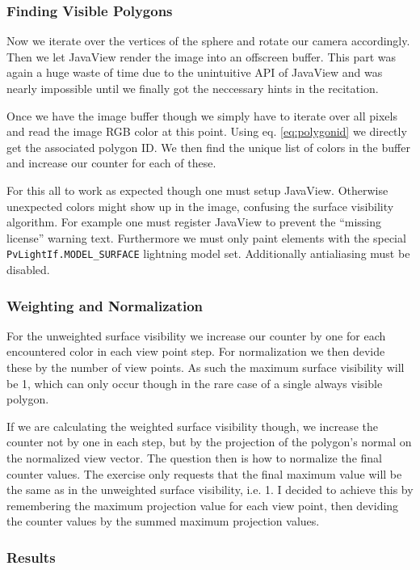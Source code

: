 \documentclass[a4paper,10pt,notitlepage]{scrreprt}
\begin{document}
\subsubsection{Finding Visible Polygons}

Now we iterate over the vertices of the sphere and rotate our camera
accordingly. Then we let JavaView render the image into an offscreen buffer.
This part was again a huge waste of time due to the unintuitive API of JavaView
and was nearly impossible until we finally got the neccessary hints in the
recitation.

Once we have the image buffer though we simply have to iterate over all pixels
and read the image RGB color at this point. Using eq. \ref{eq:polygonid} we
directly get the associated polygon ID. We then find the unique list of colors
in the buffer and increase our counter for each of these.

For this all to work as expected though one must setup JavaView. Otherwise
unexpected colors might show up in the image, confusing the surface visibility
algorithm. For example one must register JavaView to prevent the ``missing
license'' warning text. Furthermore we must only paint elements with the special
\texttt{PvLightIf.MODEL\_SURFACE} lightning model set. Additionally antialiasing
must be disabled.

\subsubsection{Weighting and Normalization}

For the unweighted surface visibility we increase our counter by one for each
encountered color in each view point step. For normalization we then devide
these by the number of view points. As such the maximum surface visibility will
be 1, which can only occur though in the rare case of a single always
visible polygon.

If we are calculating the weighted surface visibility though, we increase the
counter not by one in each step, but by the projection of the polygon's normal
on the normalized view vector. The question then is how to normalize the final
counter values. The exercise only requests that the final maximum value will be
the same as in the unweighted surface visibility, i.e. 1. I decided to achieve
this by remembering the maximum projection value for each view point, then
deviding the counter values by the summed maximum projection values.

\subsubsection{Results}




\end{document}
